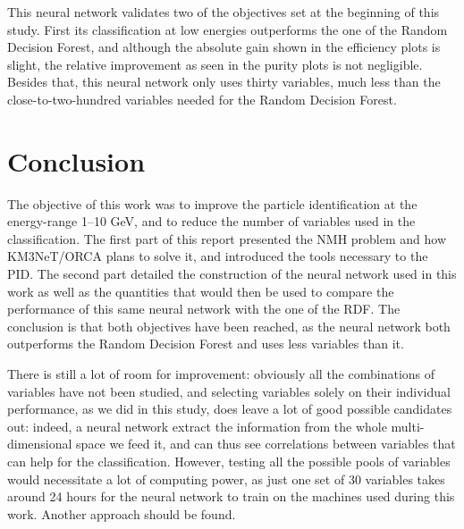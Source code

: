 This neural network validates two of the objectives set at the beginning of this study. First its classification at low energies outperforms the one of the Random Decision Forest, and although the absolute gain shown in the efficiency plots is slight, the relative improvement as seen in the purity plots is not negligible. Besides that, this neural network only uses thirty variables, much less than the close-to-two-hundred variables needed for the Random Decision Forest.

\chapter*{Conclusion}

The objective of this work was to improve the particle identification at the energy-range 1--10 GeV, and to reduce the number of variables used in the classification. The first part of this report presented the NMH problem and how KM3NeT/ORCA plans to solve it, and introduced the tools necessary to the PID. The second part detailed the construction of the neural network used in this work as well as the quantities that would then be used to compare the performance of this same neural network with the one of the RDF. The conclusion is that both objectives have been reached, as the neural network both outperforms the Random Decision Forest and uses less variables than it.

There is still a lot of room for improvement: obviously all the combinations of variables have not been studied, and selecting variables solely on their individual performance, as we did in this study, does leave a lot of good possible candidates out: indeed, a neural network extract the information from the whole multi-dimensional space we feed it, and can thus see correlations between variables that can help for the classification. However, testing all the possible pools of variables would necessitate a lot of computing power, as just one set of 30 variables takes around 24 hours for the neural network to train on the machines used during this work. Another approach should be found.


